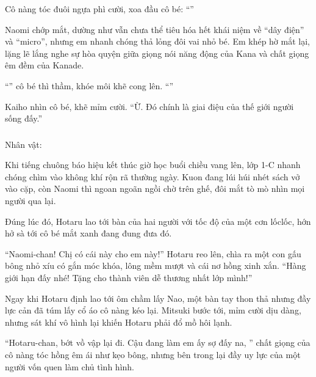 \documentclass[../main.tex]{subfiles}
\begin{document}
Cô nàng tóc đuôi ngựa phì cười, xoa đầu cô bé: ``''

Naomi chớp mắt, dường như vẫn chưa thể tiêu hóa hết khái niệm về ``dây điện'' và ``micro'', nhưng em nhanh chóng thả lỏng đôi vai nhỏ bé. Em khép hờ mắt lại, lặng lẽ lắng nghe sự hòa quyện giữa giọng nói năng động của Kana và chất giọng êm đềm của Kanade.

``'' cô bé thì thầm, khóe môi khẽ cong lên. ``''

Kaiho nhìn cô bé, khẽ mỉm cười. ``Ừ. Đó chính là giai điệu của thế giới người sống đấy.''

\newpage

\subsubsection*{\label{ep-ER3}}
\begin{center}{\caviar Nhân vật:   }\end{center}

Khi tiếng chuông báo hiệu kết thúc giờ học buổi chiều vang lên, lớp 1-C nhanh chóng chìm vào không khí rộn rã thường ngày. Kuon đang lúi húi nhét sách vở vào cặp, còn Naomi thì ngoan ngoãn ngồi chờ trên ghế, đôi mắt tò mò nhìn mọi người qua lại.

Đúng lúc đó, Hotaru lao tới bàn của hai người với tốc độ của một cơn lốclốc, hớn hở sà tới cô bé mắt xanh đang đung đưa đó.

``Naomi-chan! Chị có cái này cho em này!'' Hotaru reo lên, chìa ra một con gấu bông nhỏ xíu có gắn móc khóa, lông mềm mượt và cái nơ hồng xinh xắn. ``Hàng giới hạn đấy nhé! Tặng cho thành viên dễ thương nhất lớp mình!''

Ngay khi Hotaru định lao tới ôm chầm lấy Nao, một bàn tay thon thả nhưng đầy lực cản đã túm lấy cổ áo cô nàng kéo lại. Mitsuki bước tới, mỉm cười dịu dàng, nhưng sát khí vô hình lại khiến Hotaru phải đổ mồ hôi lạnh.

``Hotaru-chan, bớt vồ vập lại đi. Cậu đang làm em ấy sợ đấy na, '' chất giọng của cô nàng tóc hồng êm ái như kẹo bông, nhưng bên trong lại đầy uy lực của một người vốn quen làm chủ tình hình.
\end{document}

